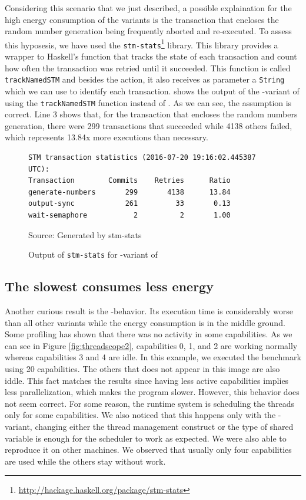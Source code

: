 Considering this scenario that we just described, a possible explaination for the high energy consumption of the \TVar variants is the transaction that encloses the random number generation being frequently aborted and re-executed. To assess this hyposesis, we have used the \texttt{stm-stats}\footnote{\url{http://hackage.haskell.org/package/stm-stats}} library. This library provides a wrapper to Haskell's \atomically function that tracks the state of each transaction and count how often the transaction was retried until it succeeded. This function is called \texttt{trackNamedSTM} and besides the \STM action, it also receives as parameter a \texttt{String} which we can use to identify each transaction.  shows the output of the \forkIO-\TVar variant of \fasta using the \texttt{trackNamedSTM} function instead of \atomically. As we can see, the assumption is correct. Line 3 shows that, for the transaction that encloses the random numbers generation, there were 299 transactions that succeeded while 4138 others failed, which represents 13.84x more executions than necessary.

\begin{figure}[htp]
  \centering
  \caption{Output of \texttt{stm-stats} for \forkIO-\TVar variant of \fasta}
	\begin{verbatim}
STM transaction statistics (2016-07-20 19:16:02.445387 UTC):
Transaction        Commits    Retries      Ratio
generate-numbers       299       4138      13.84
output-sync            261         33       0.13
wait-semaphore           2          2       1.00
  \end{verbatim}
  \footnotesize{Source: Generated by stm-stats}
  \label{fig:fasta-stm-stats}
\end{figure}

\subsection{The slowest consumes less energy}
Another curious result is the \forkOS-\MVar behavior. Its execution time is considerably worse than all other variants while the energy consumption is in the middle ground. Some profiling has shown that there was no activity in some capabilities. As we can see in Figure \ref{fig:threadscope2}, capabilities 0, 1, and 2 are working normally whereas capabilities 3 and 4 are idle. In this example, we executed the benchmark using 20 capabilities. The others that does not appear in this image are also iddle. This fact matches the results since having less active capabilities implies less parallelization, which makes the program slower. However, this behavior does not seem correct. For some reason, the runtime system is scheduling the threads only for some capabilities. We also noticed that this happens only with the \forkOS-\MVar variant, changing either the thread management construct or the type of shared variable is enough for the scheduler to work as expected. We were also able to reproduce it on other machines. We observed that usually only four capabilities are used while the others stay without work.

